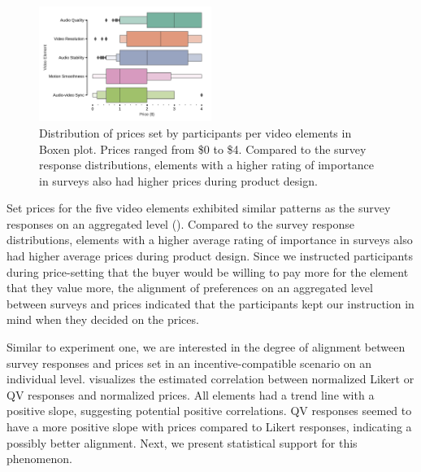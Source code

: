 \begin{figure}[ht]
    \centering
    \includegraphics[width=0.5\textwidth, keepaspectratio=true]{content/image/price_distribution_per_element.pdf}
    \caption{
      Distribution of prices set by participants per video elements in Boxen plot. 
      Prices ranged from \$0 to \$4. Compared to the survey response distributions, elements with a higher rating of importance in surveys also had higher prices during product design.
    }
    \label{fig:price_exp2}
\end{figure}


Set prices for the five video elements exhibited similar patterns as the survey responses on an aggregated level (). Compared to the survey response distributions, elements with a higher average rating of importance in surveys also had higher average prices during product design. Since we instructed participants during price-setting that the buyer would be willing to pay more for the element that they value more, the alignment of preferences on an aggregated level between surveys and prices indicated that the participants kept our instruction in mind when they decided on the prices.


Similar to experiment one, we are interested in the degree of alignment between survey responses and prices set in an incentive-compatible scenario on an individual level.  visualizes the estimated correlation between normalized Likert or QV responses and normalized prices. All elements had a trend line with a positive slope, suggesting potential positive correlations. QV responses seemed to have a more positive slope with prices compared to Likert responses, indicating a possibly better alignment. Next, we present statistical support for this phenomenon.

